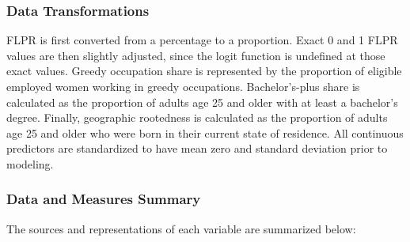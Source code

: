 \documentclass[
  letterpaper,
  DIV=11,
  numbers=noendperiod]{scrartcl}
\begin{document}
\subsubsection{Data Transformations}\label{data-transformations}

FLPR is first converted from a percentage to a proportion. Exact 0 and 1
FLPR values are then slightly adjusted, since the logit function is
undefined at those exact values. Greedy occupation share is represented
by the proportion of eligible employed women working in greedy
occupations. Bachelor's-plus share is calculated as the proportion of
adults age 25 and older with at least a bachelor's degree. Finally,
geographic rootedness is calculated as the proportion of adults age 25
and older who were born in their current state of residence. All
continuous predictors are standardized to have mean zero and standard
deviation prior to modeling.

\subsubsection{Data and Measures
Summary}\label{data-and-measures-summary}

The sources and representations of each variable are summarized below:
\end{document}
